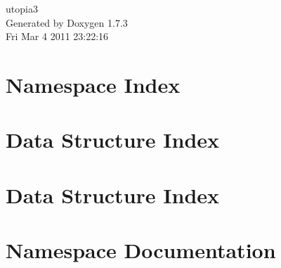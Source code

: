 \documentclass[a4paper]{book}
\begin{document}
\hypersetup{pageanchor=false}
\begin{titlepage}
\vspace*{7cm}
\begin{center}
{\Large utopia3 }\\
\vspace*{1cm}
{\large Generated by Doxygen 1.7.3}\\
\vspace*{0.5cm}
{\small Fri Mar 4 2011 23:22:16}\\
\end{center}
\end{titlepage}
\clearemptydoublepage
{}
\tableofcontents
\clearemptydoublepage
{}
\hypersetup{pageanchor=true}
\chapter{Namespace Index}

\chapter{Data Structure Index}

\chapter{Data Structure Index}

\chapter{Namespace Documentation}


\end{document}
